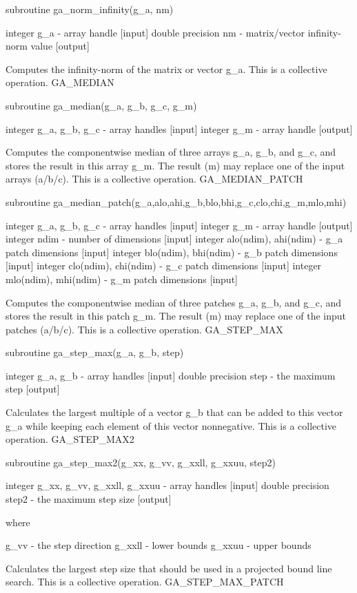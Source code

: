 subroutine ga\_norm\_infinity(g\_a, nm)

integer g\_a - array handle {[}input{]} double precision nm - matrix/vector
infinity-norm value {[}output{]}

Computes the infinity-norm of the matrix or vector g\_a. This is a
collective operation. GA\_MEDIAN

subroutine ga\_median(g\_a, g\_b, g\_c, g\_m)

integer g\_a, g\_b, g\_c - array handles {[}input{]} integer g\_m
- array handle {[}output{]}

Computes the componentwise median of three arrays g\_a, g\_b, and
g\_c, and stores the result in this array g\_m. The result (m) may
replace one of the input arrays (a/b/c). This is a collective operation.
GA\_MEDIAN\_PATCH

subroutine ga\_median\_patch(g\_a,alo,ahi,g\_b,blo,bhi,g\_c,clo,chi,g\_m,mlo,mhi)

integer g\_a, g\_b, g\_c - array handles {[}input{]} integer g\_m
- array handle {[}output{]} integer ndim - number of dimensions {[}input{]}
integer alo(ndim), ahi(ndim) - g\_a patch dimensions {[}input{]} integer
blo(ndim), bhi(ndim) - g\_b patch dimensions {[}input{]} integer clo(ndim),
chi(ndim) - g\_c patch dimensions {[}input{]} integer mlo(ndim), mhi(ndim)
- g\_m patch dimensions {[}input{]}

Computes the componentwise median of three patches g\_a, g\_b, and
g\_c, and stores the result in this patch g\_m. The result (m) may
replace one of the input patches (a/b/c). This is a collective operation.
GA\_STEP\_MAX

subroutine ga\_step\_max(g\_a, g\_b, step)

integer g\_a, g\_b - array handles {[}input{]} double precision step
- the maximum step {[}output{]}

Calculates the largest multiple of a vector g\_b that can be added
to this vector g\_a while keeping each element of this vector nonnegative.
This is a collective operation. GA\_STEP\_MAX2

subroutine ga\_step\_max2(g\_xx, g\_vv, g\_xxll, g\_xxuu, step2)

integer g\_xx, g\_vv, g\_xxll, g\_xxuu - array handles {[}input{]}
double precision step2 - the maximum step size {[}output{]}

where

g\_vv - the step direction g\_xxll - lower bounds g\_xxuu - upper
bounds

Calculates the largest step size that should be used in a projected
bound line search. This is a collective operation. GA\_STEP\_MAX\_PATCH

